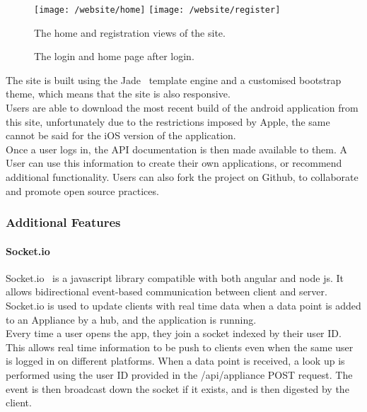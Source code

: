 \documentclass[preprint,12pt,3p]{elsarticle}
\begin{document}
\begin{figure}[H]
    \centering
    \texttt{[image: /website/home]}
    \texttt{[image: /website/register]}
    \caption {The home and registration views of the site.}
\end{figure}
\begin{figure}[H]
    \centering

    \caption {The login and home page after login.}
\end{figure}

The site is built using the Jade~\cite{jade} template engine and a customised bootstrap~\cite{bootstrap} theme, which means that the site is also responsive.\\
Users are able to download the most recent build of the android application from this site, unfortunately due to the restrictions imposed by Apple, the same cannot be said for the iOS version of the application.\\
Once a user logs in, the API documentation is then made available to them. A User can use this information to create their own applications, or recommend additional functionality. Users can also fork the project on Github, to collaborate and promote open source practices.

\subsubsection{Additional Features}

\paragraph{Socket.io}
Socket.io~\cite{socketio} is a javascript library compatible with both angular and node js. It allows bidirectional event-based communication between client and server.\\
Socket.io is used to update clients with real time data when a data point is added to an Appliance by a hub, and the application is running.\\
Every time a user opens the app, they join a socket indexed by their user ID. This allows real time information to be push to clients even when the same user is logged in on different platforms. When a data point is received, a look up is performed using the user ID provided in the /api/appliance POST request. The event is then broadcast down the socket if it exists, and is then digested by the client.
\end{document}
